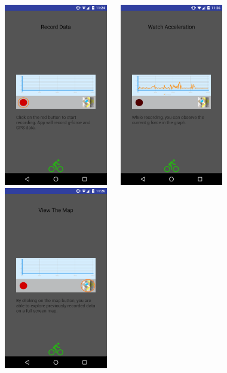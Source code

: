 \documentclass[10pt,a4paper]{article} %
\begin{document}
    \begin{figure}[H]
    \centering
    \includegraphics[width=5cm, height=8cm]{pic7} 
    \endminipage\hfill
    \includegraphics[width=5cm, height=8cm]{pic8}
    \endminipage\hfill
    \includegraphics[width=5cm, height=8cm]{pic9}
    \endminipage\hfill
    
    
    
    \end{figure}
    
\end{document}
